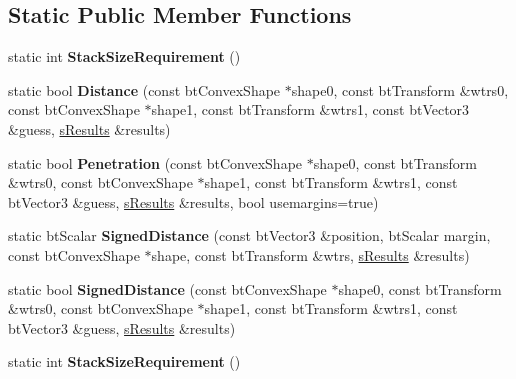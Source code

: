 \subsection*{Static Public Member Functions}
\begin{DoxyCompactItemize}
\item 
\mbox{\label{structbtGjkEpaSolver2_aa6d1e7ce16abccf3bbb6b8cd2468e61b}} 
static int {\bfseries Stack\+Size\+Requirement} ()
\item 
\mbox{\label{structbtGjkEpaSolver2_a687580e208340d8d92baa7a108833a5d}} 
static bool {\bfseries Distance} (const bt\+Convex\+Shape $\ast$shape0, const bt\+Transform \&wtrs0, const bt\+Convex\+Shape $\ast$shape1, const bt\+Transform \&wtrs1, const bt\+Vector3 \&guess, \hyperlink{structbtGjkEpaSolver2_1_1sResults}{s\+Results} \&results)
\item 
\mbox{\label{structbtGjkEpaSolver2_a6813bb52592ff84e2fea43285719ba55}} 
static bool {\bfseries Penetration} (const bt\+Convex\+Shape $\ast$shape0, const bt\+Transform \&wtrs0, const bt\+Convex\+Shape $\ast$shape1, const bt\+Transform \&wtrs1, const bt\+Vector3 \&guess, \hyperlink{structbtGjkEpaSolver2_1_1sResults}{s\+Results} \&results, bool usemargins=true)
\item 
\mbox{\label{structbtGjkEpaSolver2_a01766fb4fe5a5e846228c07c5c947ab3}} 
static bt\+Scalar {\bfseries Signed\+Distance} (const bt\+Vector3 \&position, bt\+Scalar margin, const bt\+Convex\+Shape $\ast$shape, const bt\+Transform \&wtrs, \hyperlink{structbtGjkEpaSolver2_1_1sResults}{s\+Results} \&results)
\item 
\mbox{\label{structbtGjkEpaSolver2_ae14d4dcf29d472f8fd47d4e5a74f7e00}} 
static bool {\bfseries Signed\+Distance} (const bt\+Convex\+Shape $\ast$shape0, const bt\+Transform \&wtrs0, const bt\+Convex\+Shape $\ast$shape1, const bt\+Transform \&wtrs1, const bt\+Vector3 \&guess, \hyperlink{structbtGjkEpaSolver2_1_1sResults}{s\+Results} \&results)
\item 
\mbox{\label{structbtGjkEpaSolver2_a26cda5424818b5631d72e28f729a19b1}} 
static int {\bfseries Stack\+Size\+Requirement} ()
\item 

\end{DoxyCompactItemize}
